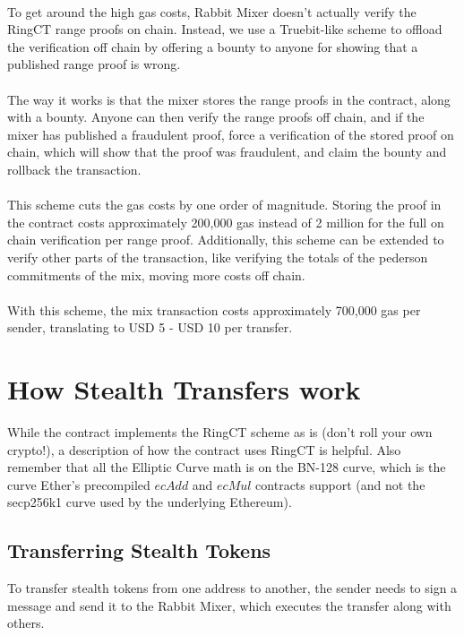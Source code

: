 \documentclass{article}
\begin{document}
\paragraph{}
To get around the high gas costs, Rabbit Mixer doesn't actually verify the RingCT range proofs on chain. Instead, we use a Truebit-like scheme to offload the verification off chain by offering a bounty to anyone for showing that a published range proof is wrong.  
\paragraph{}
The way it works is that the mixer stores the range proofs in the contract, along with a bounty. Anyone can then verify the range proofs off chain, and if the mixer has published a fraudulent proof, force a verification of the stored proof on chain, which will show that the proof was fraudulent, and claim the bounty and rollback the transaction. 
\paragraph{}
This scheme cuts the gas costs by one order of magnitude. Storing the proof in the contract costs approximately 200,000 gas instead of 2 million for the full on chain verification per range proof. Additionally, this scheme can be extended to verify other parts of the transaction, like verifying the totals of the pederson commitments of the mix, moving more costs off chain.
\paragraph{} 
With this scheme, the mix transaction costs approximately 700,000 gas per sender, translating to USD 5 - USD 10 per transfer. 


\section{How Stealth Transfers work}
While the contract implements the RingCT scheme as is (don't roll your own crypto!), a description of how the contract uses RingCT is helpful. Also remember that all the Elliptic Curve math is on the BN-128 curve, which is the curve Ether's precompiled $ecAdd$ and $ecMul$ contracts support (and not the secp256k1 curve used by the underlying Ethereum). 

\subsection{Transferring Stealth Tokens}
To transfer stealth tokens from one address to another, the sender needs to sign a message and send it to the Rabbit Mixer, which executes the transfer along with others.
\end{document}
